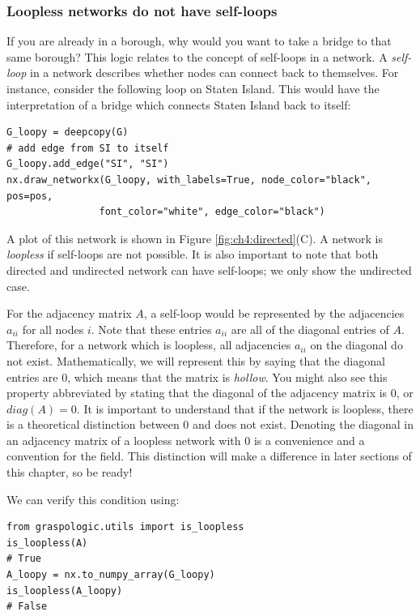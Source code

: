 \subsubsection{Loopless networks do not have self-loops}

If you are already in a borough, why would you want to take a bridge to that same borough? This logic relates to the concept of {self-loops} in a network. A \textit{self-loop} in a network describes whether nodes can connect back to themselves. For instance, consider the following loop on Staten Island. This would have the interpretation of a bridge which connects Staten Island back to itself:
\begin{lstlisting}[style=python]
G_loopy = deepcopy(G)
# add edge from SI to itself
G_loopy.add_edge("SI", "SI")
nx.draw_networkx(G_loopy, with_labels=True, node_color="black", pos=pos,
                font_color="white", edge_color="black")
\end{lstlisting}

A plot of this network is shown in Figure \ref{fig:ch4:directed}(C). A network is \textit{loopless} if self-loops are not possible. It is also important to note that both directed and undirected network can have self-loops; we only show the undirected case.

For the adjacency matrix $A$, a self-loop would be represented by the adjacencies $a_{ii}$ for all nodes $i$. Note that these entries $a_{ii}$ are all of the {diagonal} entries of $A$. Therefore, for a network which is loopless, all adjacencies $a_{ii}$ on the diagonal {do not exist}. Mathematically, we will represent this by saying that the diagonal entries are $0$, which means that the matrix is \textit{hollow}. You might also see this property abbreviated by stating that the diagonal of the adjacency matrix is $0$, or $diag(A) = 0$. It is important to understand that if the network is loopless, there is a theoretical distinction between $0$ and {does not exist}. Denoting the diagonal in an adjacency matrix of a loopless network with $0$ is a convenience and a convention for the field. This distinction will make a difference in later sections of this chapter, so be ready!

We can verify this condition using: 

\begin{lstlisting}[style=python]
from graspologic.utils import is_loopless
is_loopless(A)
# True
A_loopy = nx.to_numpy_array(G_loopy)
is_loopless(A_loopy)
# False
\end{lstlisting}


